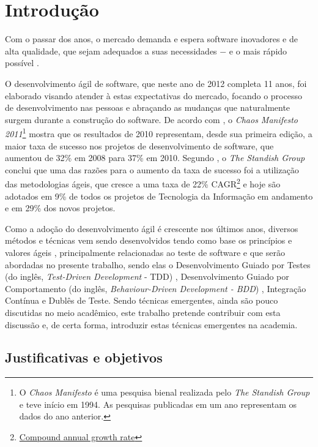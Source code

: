 \chapter{Introdução}

Com o passar dos anos, o mercado demanda e espera software inovadores e de alta qualidade, que sejam adequados a suas necessidades $-$ e o mais rápido possível \cite{TheBusinessOfInnovation}.

O desenvolvimento ágil de software, que neste ano de 2012 completa 11 anos, foi elaborado \cite{AgileManifesto} visando atender à estas expectativas do mercado, focando o processo de desenvolvimento nas pessoas e abraçando as mudanças que  naturalmente surgem durante a construção do software. De acordo com , o \textit{Chaos Manifesto 2011}\footnote{O \textit{Chaos Manifesto} é uma pesquisa bienal realizada pelo \textit{The Standish Group} e teve início em 1994. As pesquisas publicadas em um ano representam os dados do ano anterior.} mostra que os resultados de 2010 representam, desde sua primeira edição, a maior taxa de sucesso nos projetos de desenvolvimento de software, que aumentou de 32\% em 2008 para 37\% em 2010. Segundo , o \textit{The Standish Group} conclui que uma das razões para o aumento da taxa de sucesso foi a utilização das metodologias ágeis, que cresce a uma taxa de 22\% CAGR\footnote{\href{http://en.wikipedia.org/wiki/Compound_annual_growth_rate} {Compound annual growth rate}} e hoje são adotados em 9\% de todos os projetos de Tecnologia da Informação em andamento e em 29\% dos novos projetos.

Como a adoção do desenvolvimento ágil é crescente nos últimos anos, diversos métodos e técnicas vem sendo desenvolvidos tendo como base os princípios e valores ágeis \cite{BDDRodrigo}, principalmente relacionadas ao teste de software e que serão abordadas no presente trabalho, sendo elas o Desenvolvimento Guiado por Testes (do inglês, \textit{Test-Driven Development} - TDD) , Desenvolvimento Guiado por Comportamento (do inglês, \textit{Behaviour-Driven Development - BDD}) , Integração Contínua e Dublês de Teste. Sendo técnicas emergentes, ainda são pouco discutidas no meio acadêmico, este trabalho pretende contribuir com esta discussão e, de certa forma, introduzir estas técnicas emergentes na academia.


\section{Justificativas e objetivos}

